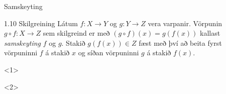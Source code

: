 \documentclass[icelandic,a4paper,12pt]{article}
\begin{document}
\begin{frame}{Samskeyting}
\begin{block}{1.10 Skilgreining}
Látum $f:X \to Y$ og $g:Y \to Z$ vera varpanir. Vörpunin 
$g\circ f:X \to Z$ sem skilgreind er með 
$(g\circ f)(x)=g(f(x))$ kallast \emph{samskeyting} $f$ og 
$g$. 
Stakið 
$g(f(x)) \in Z$ fæst með því að beita fyrst vörpuninni $f$ á stakið 
$x$ og síðan vörpuninni $g$ á stakið $f(x)$.
\end{block}
{<1>}
\pause

{<2>}

\end{frame}
\end{document}

